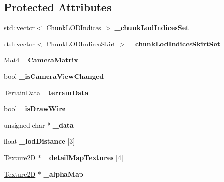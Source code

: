 \subsection*{Protected Attributes}
\begin{DoxyCompactItemize}
\item 
\mbox{\label{classTerrain_a30e497283a0cced80cb187c0a895749f}} 
std\+::vector$<$ Chunk\+L\+O\+D\+Indices $>$ {\bfseries \+\_\+chunk\+Lod\+Indices\+Set}
\item 
\mbox{\label{classTerrain_adddeffebdf8da6854ea6ec465babcd7a}} 
std\+::vector$<$ Chunk\+L\+O\+D\+Indices\+Skirt $>$ {\bfseries \+\_\+chunk\+Lod\+Indices\+Skirt\+Set}
\item 
\mbox{\label{classTerrain_a975aaf5b247568f07a287d4b0a16435d}} 
\hyperlink{classMat4}{Mat4} {\bfseries \+\_\+\+Camera\+Matrix}
\item 
\mbox{\label{classTerrain_a649a6aa2f90930e0e12211a144c05901}} 
bool {\bfseries \+\_\+is\+Camera\+View\+Changed}
\item 
\mbox{\label{classTerrain_accd2781e4562d473c5bfb8abb9644f45}} 
\hyperlink{structTerrain_1_1TerrainData}{Terrain\+Data} {\bfseries \+\_\+terrain\+Data}
\item 
\mbox{\label{classTerrain_abc95e8a7cd54a37ff817588b72e54634}} 
bool {\bfseries \+\_\+is\+Draw\+Wire}
\item 
\mbox{\label{classTerrain_aaae08cc05f491f02e1cf45b8f8de6494}} 
unsigned char $\ast$ {\bfseries \+\_\+data}
\item 
\mbox{\label{classTerrain_ab0920d49c7a37561b8ae541d596ed596}} 
float {\bfseries \+\_\+lod\+Distance} \mbox{[}3\mbox{]}
\item 
\mbox{\label{classTerrain_afffe5e6d23d1daac75ac2ae9966b17b7}} 
\hyperlink{classTexture2D}{Texture2D} $\ast$ {\bfseries \+\_\+detail\+Map\+Textures} \mbox{[}4\mbox{]}
\item 
\mbox{\label{classTerrain_a1805b5941bddd0a643a15e97c61b3d7e}} 
\hyperlink{classTexture2D}{Texture2D} $\ast$ {\bfseries \+\_\+alpha\+Map}

\end{DoxyCompactItemize}
